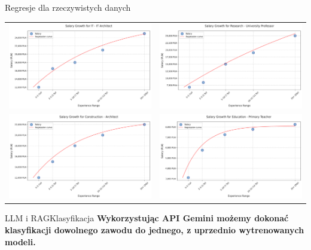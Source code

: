 \begin{frame}[t]{Regresje dla rzeczywistych danych}
\centering
\begin{tabular}{cc}
    \pause
\includegraphics[width=0.45\linewidth]{img/salary_progression2} &
    \pause
\includegraphics[width=0.45\linewidth]{img/salary_progression4} \\
    \pause
\includegraphics[width=0.45\linewidth]{img/salary_progression6} &
    \pause
\includegraphics[width=0.45\linewidth]{img/salary_progression7}
\end{tabular}
\end{frame}

\begin{frame}[t]{LLM i RAG}{Klasyfikacja}
    \textbf{Wykorzystując API Gemini możemy dokonać klasyfikacji dowolnego zawodu do jednego,
        z uprzednio wytrenowanych modeli.}
    \\
    \pause
    \\
    \pause
\end{frame}
